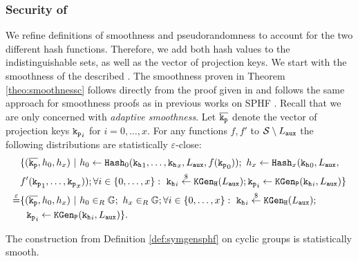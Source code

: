 \subsubsection[Security of SPHFx]{Security of \SPHFF}
We refine definitions of smoothness and pseudorandomness to account for the two different hash functions.
Therefore, we add both hash values to the indistinguishable sets, as well as the vector of projection keys.
We start with the smoothness of the described \SPHFF.
The smoothness proven in Theorem \ref{theo:smoothnessc} follows directly from the proof given in \cite[Appendix D.3]{cryptoeprint:2013:034} and follows the same approach for smoothness proofs as in previous works on SPHF \cite{cryptoeprint:2013:034,Gennaro2003,Katz2011}.
Recall that we are only concerned with \emph{adaptive smoothness}.
Let $\overline{\mathtt{k_p}}$ denote the vector of projection keys $\mathtt{k_p}_i$ for $i=0,\dots,x$.
For any functions $f,f'$ to $\mathcal{S}\setminus L_\mathtt{aux}$ the following distributions are statistically $\varepsilon$-close:
\begin{align*}
& \{(\overline{\mathtt{k_p}},h_0,h_x) ~|~ h_0\gets\mathtt{Hash}_0(\mathtt{k_h}_1,\dots,\mathtt{k_h}_x,L_\mathtt{aux},f(\mathtt{k_p}_0));~ h_x\gets\mathtt{Hash}_x(\mathtt{k_h}_0,L_\mathtt{aux}, \\
& f'(\mathtt{k_p}_1,\dots,\mathtt{k_p}_x)); \forall i\in\{0,\dots,x\}:~ \mathtt{k_h}_i\stackrel{\$}{\gets}\mathtt{KGen_H}(L_\mathtt{aux}); \mathtt{k_p}_i\gets\mathtt{KGen_P}(\mathtt{k_h}_i,L_\mathtt{aux})\} \\
\stackrel{\varepsilon}{=} & \{(\overline{\mathtt{k_p}},h_0,h_x) ~|~ h_0\in_R\mathbb{G};~ h_x\in_R\mathbb{G}; \forall i\in\{0,\dots,x\}:~ \mathtt{k_h}_i\stackrel{\$}{\gets}\mathtt{KGen_H}(L_\mathtt{aux}); \\
& ~~\mathtt{k_p}_i\gets\mathtt{KGen_P}(\mathtt{k_h}_i,L_\mathtt{aux})\}.
\end{align*}

\begin{theorem}\label{theo:smoothnessc}
The \SPHFF construction from Definition \ref{def:symgensphf} on cyclic groups is statistically smooth.
\end{theorem}

